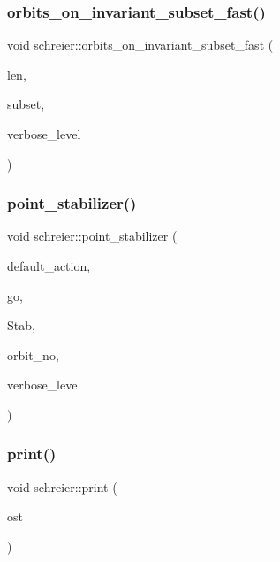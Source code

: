 \subsubsection{\texorpdfstring{orbits\+\_\+on\+\_\+invariant\+\_\+subset\+\_\+fast()}{orbits\_on\_invariant\_subset\_fast()}}
{\footnotesize\ttfamily void schreier\+::orbits\+\_\+on\+\_\+invariant\+\_\+subset\+\_\+fast (\begin{DoxyParamCaption}\item[{\mbox{\hyperlink{galois_8h_a09fddde158a3a20bd2dcadb609de11dc}{I\+NT}}}]{len,  }\item[{\mbox{\hyperlink{galois_8h_a09fddde158a3a20bd2dcadb609de11dc}{I\+NT}} $\ast$}]{subset,  }\item[{\mbox{\hyperlink{galois_8h_a09fddde158a3a20bd2dcadb609de11dc}{I\+NT}}}]{verbose\+\_\+level }\end{DoxyParamCaption})}

\mbox{\label{classschreier_a976a31dfe3238284d96fc200532c7077}} 
\subsubsection{\texorpdfstring{point\+\_\+stabilizer()}{point\_stabilizer()}}
{\footnotesize\ttfamily void schreier\+::point\+\_\+stabilizer (\begin{DoxyParamCaption}\item[{\mbox{\hyperlink{classaction}{action}} $\ast$}]{default\+\_\+action,  }\item[{\mbox{\hyperlink{classlonginteger__object}{longinteger\+\_\+object}} \&}]{go,  }\item[{\mbox{\hyperlink{classsims}{sims}} $\ast$\&}]{Stab,  }\item[{\mbox{\hyperlink{galois_8h_a09fddde158a3a20bd2dcadb609de11dc}{I\+NT}}}]{orbit\+\_\+no,  }\item[{\mbox{\hyperlink{galois_8h_a09fddde158a3a20bd2dcadb609de11dc}{I\+NT}}}]{verbose\+\_\+level }\end{DoxyParamCaption})}

\mbox{\label{classschreier_a7b5a4341c51edb58100384ce87700749}} 
\subsubsection{\texorpdfstring{print()}{print()}}
{\footnotesize\ttfamily void schreier\+::print (\begin{DoxyParamCaption}\item[{ostream \&}]{ost }\end{DoxyParamCaption})}

